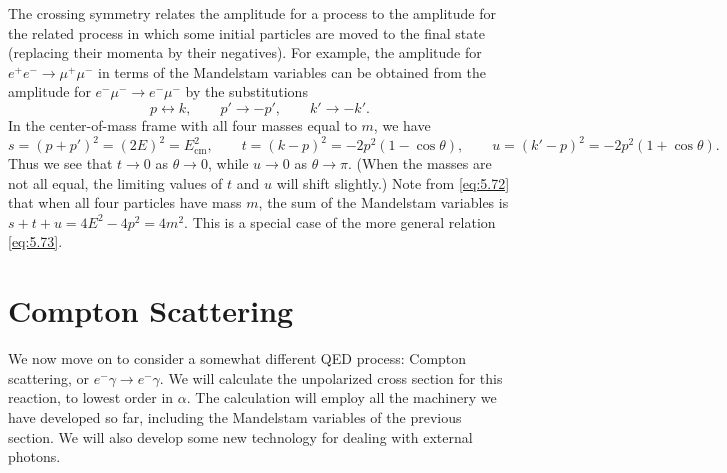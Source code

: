 The crossing symmetry relates the amplitude for a process to the amplitude
for the related process in which some initial particles are moved to the final
state (replacing their momenta by their negatives).  For example, the
amplitude for $e^{+}e^{-}\to\mu^{+}\mu^{-}$ in terms of the Mandelstam
variables can be obtained from the amplitude for $e^{-}\mu^{-}\to e^{-}\mu^{-}$
by the substitutions
\begin{equation}
  p \leftrightarrow k,\qquad p' \to -p',\qquad k' \to -k' .
  \label{eq:5.68}
\end{equation}
In the center-of-mass frame with all four masses equal to $m$, we have
\begin{equation}
  s = (p+p')^2 = (2E)^2 = E^2_{\mathrm{cm}},\qquad
  t = (k-p)^2 = -2p^2(1-\cos\theta),\qquad
  u = (k'-p)^2 = -2p^2(1+\cos\theta) .
  \label{eq:5.72}
\end{equation}
Thus we see that $t\to 0$ as $\theta\to 0$, while $u\to 0$ as $\theta\to\pi$.
(When the masses are not all equal, the limiting values of $t$ and $u$ will
shift slightly.)  Note from \eqref{eq:5.72} that when all four particles have
mass $m$, the sum of the Mandelstam variables is
$s+t+u = 4E^2 - 4p^2 = 4m^2$.  This is a special case of the more general
relation \eqref{eq:5.73}.

\section{Compton Scattering}

We now move on to consider a somewhat different QED process: Compton
scattering, or $e^{-}\gamma\to e^{-}\gamma$.  We will calculate the unpolarized
cross section for this reaction, to lowest order in $\alpha$.  The calculation
will employ all the machinery we have developed so far, including the
Mandelstam variables of the previous section.  We will also develop some new
technology for dealing with external photons.

